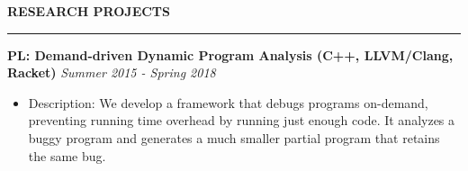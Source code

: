 \documentclass[10pt,letterpaper]{article}
\newenvironment{mysection}[1]{ %
  \medskip
  \MakeUppercase{\bf #1}
  \medskip
  \hrule
  \medskip
  \begin{list}{}{
      \setlength{\leftmargin}{1.5em}
    }
  \item[]
}{
  \end{list}
}
\begin{document}
\begin{mysection}{Research Projects}
  \textbf{PL: Demand-driven Dynamic Program Analysis (C++,
    LLVM/Clang, Racket)} \hfill \emph{Summer 2015 - Spring 2018}

  \begin{itemize}
  \item Description: We develop a framework that debugs programs
    on-demand, preventing running time overhead by running just enough
    code. It analyzes a buggy program and generates a much smaller
    partial program that retains the same bug.
  \end{itemize}


\end{mysection}
\end{document}
